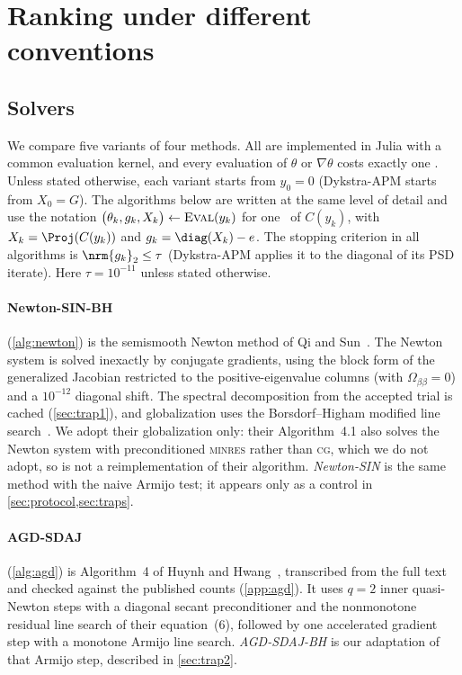 \section{Ranking under different conventions}\label{sec:ranking}

\subsection{Solvers}\label{sec:solvers}
We compare five variants of four methods. All are implemented in Julia with
a common evaluation kernel, and every evaluation of $\theta$ or
$\nabla\theta$ costs exactly one \EVD. Unless stated otherwise, each variant
starts from $y_0=0$ (Dykstra-APM starts from $X_0=G$). The algorithms below
are written at the same level of detail and use the notation
$\bigl(\theta_k,g_k,X_k\bigr)\leftarrow\textsc{Eval}(y_k)$ for one \EVD\ of
$C(y_k)$, with $X_k=\Proj(C(y_k))$ and $g_k=\diag(X_k)-e$. The stopping
criterion in all algorithms is $\nrm{g_k}_2\le\tau$ (Dykstra-APM applies it to
the diagonal of its PSD iterate). Here $\tau=10^{-11}$ unless stated
otherwise.

\paragraph{Newton-SIN-BH} (\cref{alg:newton}) is the semismooth Newton
method of Qi and Sun~\cite{qisun2006quadratically}. The Newton system is solved inexactly by
conjugate gradients, using the block form of the generalized Jacobian
restricted to the positive-eigenvalue columns (with
$\Omega_{\beta\beta}=0$) and a $10^{-12}$ diagonal shift. The spectral
decomposition from the accepted trial is cached (\cref{sec:trap1}), and
globalization uses the Borsdorf--Higham modified line
search~\cite[Alg.~4.1, Step~6]{borsdorf2010preconditioned}. We adopt their
globalization only: their Algorithm~4.1 also solves the Newton system with
preconditioned \textsc{minres} rather than \textsc{cg}, which we do not
adopt, so  is not a reimplementation of their
algorithm. \emph{Newton-SIN} is the same method with the
naive Armijo test; it appears only as a control in
\cref{sec:protocol,sec:traps}.

\paragraph{AGD-SDAJ} (\cref{alg:agd}) is Algorithm~4 of Huynh and
Hwang~\cite{huynh2025accelerated}, transcribed from the full text and checked against
the published counts (\cref{app:agd}). It uses $q=2$ inner quasi-Newton steps
with a diagonal secant preconditioner and the nonmonotone residual line search
of their equation~(6), followed by one accelerated gradient step with a
monotone Armijo line search. \emph{AGD-SDAJ-BH} is our adaptation of that
Armijo step, described in \cref{sec:trap2}.

